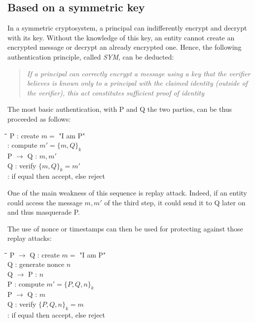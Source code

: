 \subsection{Based on a symmetric key}
In a symmetric cryptosystem, a principal can indifferently encrypt and decrypt with its key. Without the knowledge of this key, an entity cannot create an encrypted message or decrypt an already encrypted one. Hence, the following authentication principle, called \emph{SYM}, can be deducted\cite{Woo1997}:

\begin{quote}
	\textit{If a principal can correctly encrypt a message using a key that the verifier believes is known
	only to a principal with the claimed identity (outside of the verifier), this act constitutes sufficient proof of identity}
\end{quote}

The most basic authentication, with P and Q the two parties, can be thus proceeded as follows:

\begin{tabbing}
	\hspace{4em}\=\hspace{4em}\=\hspace{2em}\=\kill
	\>  P \>  : \> create $m =$ "I am P" \\
	\>    \>  : \> compute $m' = \lbrace m, Q \rbrace_{k}$ 				\\
	\>  P $\rightarrow$ Q \>  : \> $m,m'$ \\
	\>  Q \>  : \> verify $\lbrace m, Q \rbrace_{k} = m'$ \\
		\>    \>  : \> if equal then accept, else reject \\
\end{tabbing} 

One of the main weakness of this sequence is replay attack. Indeed, if an entity could access the message $m,m'$ of the third step, it could send it to Q later on and thus masquerade P.

The use of nonce or timestamps can then be used for protecting against those replay attacks:

\begin{tabbing}
	\hspace{4em}\=\hspace{4em}\=\hspace{2em}\=\kill
	\>  P $\rightarrow$ Q\>  : \> create $m =$ "I am P" \\
	\>  Q  \>  : \> generate nonce $n$	\\
	\>  Q $\rightarrow$ P \>  : \> $n$ \\
	\>  P  \>  : \> compute $m' = \lbrace P, Q, n \rbrace_{k}$ 				\\
	\>  P $\rightarrow$ Q \>  : \> $m$ \\
	\>  Q \>  : \> verify $\lbrace P, Q, n \rbrace_{k} = m$ \\
	\>    \>  : \> if equal then accept, else reject \\
\end{tabbing} 

